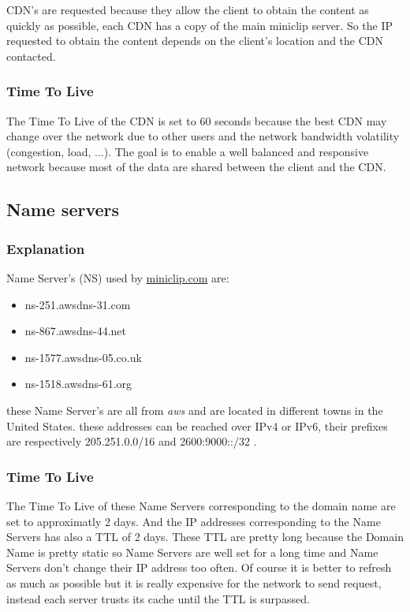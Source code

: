 \documentclass{article}
\begin{document}
CDN's are requested because they allow the client to obtain the content as quickly as possible, each CDN has a copy of the main miniclip server. So the IP requested to obtain the content depends on the client's location and the CDN contacted.

\subsubsection{Time To Live}
\label{subsub:ipttl}

The Time To Live of the CDN is set to 60 seconds because the best CDN may change over the network due to other users and the network bandwidth volatility (congestion, load, ...). The goal is to enable a well balanced and responsive network because most of the data are shared between the client and the CDN.

\subsection{Name servers}
\subsubsection{Explanation}
\label{subsub:nsexp}

Name Server's (NS) used by \url{miniclip.com} are:
\begin{itemize}
    \itemsep-0.1em 
    \item ns-251.awsdns-31.com
    \item ns-867.awsdns-44.net
    \item ns-1577.awsdns-05.co.uk
    \item ns-1518.awsdns-61.org
\end{itemize}

these Name Server's are all from \textit{aws} and are located in different towns in the United States. these addresses can be reached over IPv4 or IPv6, their prefixes are respectively 205.251.0.0/16 and 2600:9000::/32 .

\subsubsection{Time To Live}
\label{subsub:nsttl}

The Time To Live of these Name Servers corresponding to the domain name are set to approximatly 2 days. And the IP addresses corresponding to the Name Servers has also a TTL of 2 days. These TTL are pretty long because the Domain Name is pretty static so Name Servers are well set for a long time and Name Servers don't change their IP address too often. Of course it is better to refresh as much as possible but it is really expensive for the network to send request, instead each server trusts its cache until the TTL is surpassed.
\end{document}
